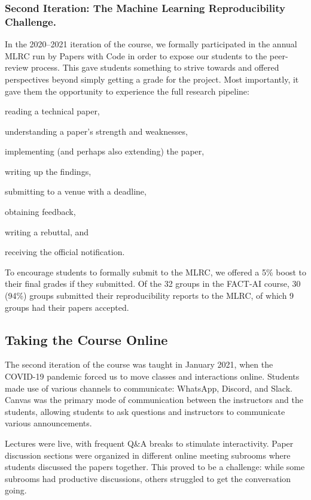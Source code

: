 \documentclass[letterpaper]{article}
\begin{document}
\subsubsection{Second Iteration: The Machine Learning Reproducibility Challenge.}
In the 2020--2021 iteration of the course, we formally participated in the annual MLRC run by Papers with Code \citep{paperswithcode2020} in order to expose our students to the peer-review process. 
This gave students something to strive towards and offered perspectives beyond simply getting a grade for the project. 
Most importantly, it gave them the opportunity to experience the full research pipeline: 
\begin{enumerate*}[label=(\roman*)]
	\item reading a technical paper, 
	\item understanding a paper's strength and weaknesses, 
	\item implementing (and perhaps also extending) the paper, 
	\item writing up the findings, 
	\item submitting to a venue with a deadline, 
	\item obtaining feedback, 
	\item writing a rebuttal, and
	\item receiving the official notification. 
\end{enumerate*}
To encourage students to formally submit to the MLRC, we offered a 5\% boost to their final grades if they submitted. 
Of the 32 groups in the FACT-AI course, 30 (94\%) groups submitted their reproducibility reports to the MLRC, of which 9 groups had their papers accepted.

\subsection{Taking the Course Online}
The second iteration of the course was taught in January 2021, when the COVID-19 pandemic forced us to move classes and interactions online. 
Students made use of various channels to communicate: WhatsApp, Discord, and Slack.  
Canvas was the primary mode of communication between the instructors and the students, allowing students to ask questions and instructors to communicate various announcements. 

Lectures were live, with frequent Q\&A breaks to stimulate interactivity. 
Paper discussion sections were organized in different online meeting subrooms where students discussed the papers together.  
This proved to be a challenge: while some subrooms had productive discussions, others struggled to get the conversation going. 
\end{document}
